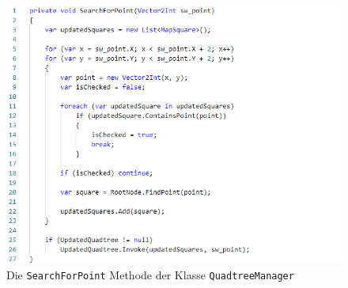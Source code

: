 \documentclass[a4paper,12pt]{article}
\newcommand{\code}{\texttt}
\begin{document}
\begin{figure}[H]
    \centering
    \includegraphics[width=1\linewidth]{Bilder/Aufgabe3/Teilaufgabe_C/Quadtree_01.png}
    \caption{Die \code{SearchForPoint} Methode der Klasse \code{QuadtreeManager}}
\end{figure}
\end{document}
